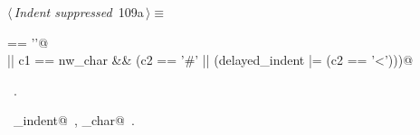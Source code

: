 \documentclass[a4paper]{report}
\begin{document}
\begin{flushleft} \small
\begin{minipage}{\linewidth}\label{scrap229}\raggedright\small
{} $\langle\,${\it Indent suppressed}\nobreak\ {\footnotesize {109a}}$\,\rangle\equiv$
\vspace{-1ex}
\begin{list}{}{} \item
\mbox{} == '\n'@\\
\mbox{}\verb@|| c1 == nw_char && (c2 == '#' || (delayed_indent |= (c2 == '<')))@{\NWsep}
\end{list}
\vspace{-1.5ex}
\footnotesize
\begin{list}{}{\setlength{\itemsep}{-\parsep}\setlength{\itemindent}{-\leftmargin}}
\item \NWtxtMacroRefIn\ .
\item \NWtxtIdentsUsed\nobreak\  \verb@delayed_indent@\nobreak\ , \verb@nw_char@\nobreak\ .
\item{}
\end{list}
\end{minipage}\vspace{4ex}
\end{flushleft}
\end{document}
